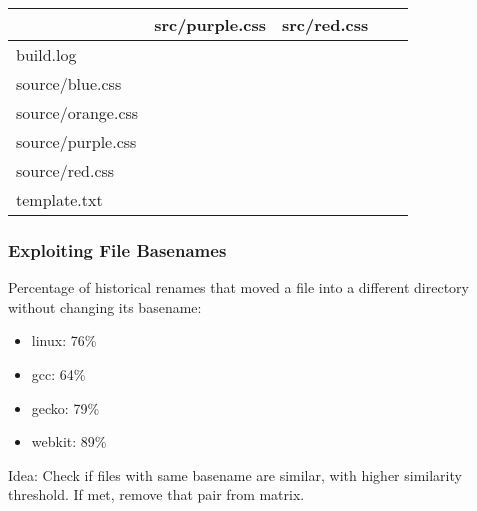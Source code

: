 \documentclass[compress,t]{beamer}
\begin{document}
\begin{frame}
{\begin{center}
{{\begin{tabular}{l|l|l|l|l}
                          & {src/\color{mypurple}purple.css}
                          & {src/\color{myred}red.css} \\
        \hline
        build.log                           &&&& \\
        {source/\color{myblue}blue.css}     &&&& \\
        {source/\color{orange}orange.css}   &&&& \\
        {source/\color{mypurple}purple.css} &&&& \\
        {source/\color{myred}red.css}       &&&& \\
        template.txt                        &&&& \\
      \end{tabular}
    }
    }
  \end{center}
  }

  
\end{frame}


\begin{frame}
  \frametitle{Exploiting File Basenames}

  Percentage of historical renames that moved a file into a different
  directory without changing its basename:
  \pause
  \begin{itemize}
    \item linux: 76\%
    \item gcc: 64\%
    \item gecko: 79\%
    \item webkit: 89\%
  \end{itemize}

  \pause
  \vspace*{\baselineskip}
  Idea: Check if files with same basename are similar, with higher
  similarity threshold.  If met, remove that pair from matrix.

\end{frame}
\end{document}
